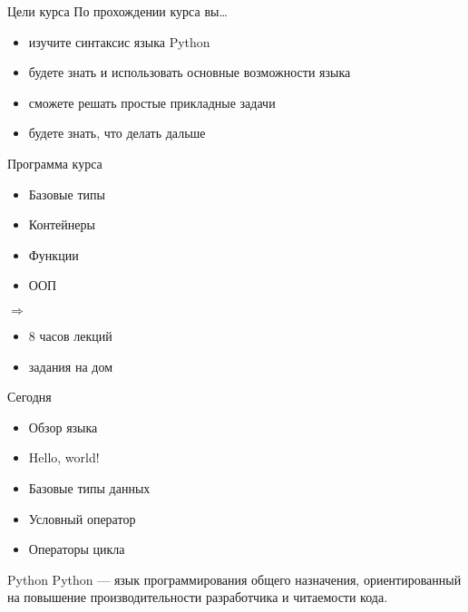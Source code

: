 \documentclass[hyperref={pdftex,unicode}]{beamer}
\begin{document}
\begin{frame}{Цели курса}
  По прохождении курса вы\dots
  \begin{itemize}
    \item изучите синтаксис языка Python
    \item будете знать и использовать основные возможности языка
    \item сможете решать простые прикладные задачи
    \item будете знать, что делать дальше
  \end{itemize}
\end{frame}

\begin{frame}{Программа курса}
  \begin{minipage}{0.4\linewidth}
    \begin{itemize}
    \item Базовые типы
    \item Контейнеры
    \item Функции
    \item ООП
    \end{itemize}
  \end{minipage}
  $ \Longrightarrow $
  \hfill
  \begin{minipage}{0.4\linewidth}
    \begin{itemize}  
    \item 8 часов лекций
    \item задания на дом
   \end{itemize}
  \end{minipage}
\end{frame}

\begin{frame}{Сегодня}
  \begin{itemize}
  \item Обзор языка
  \item Hello, world!
  \item Базовые типы данных
  \item Условный оператор
  \item Операторы цикла
  \end{itemize}
\end{frame}

\begin{frame}{Python}
  Python --- язык программирования общего назначения,
  ориентированный на повышение производительности разработчика и читаемости кода.
\end{frame}
\end{document}
